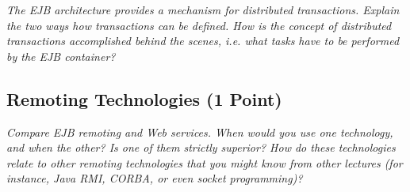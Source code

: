 \documentclass[a4paper,10pt]{article}
\begin{document}
\emph{
The EJB architecture provides a mechanism for distributed transactions. Explain the two ways how
transactions can be defined. How is the concept of distributed transactions accomplished behind the
scenes, i.e. what tasks have to be performed by the EJB container?}

\vspace{3mm}

\subsection{Remoting Technologies (1 Point)}

\emph{Compare EJB remoting and Web services. When would you use one technology, and when the other? Is
one of them strictly superior? How do these technologies relate to other remoting technologies that you
might know from other lectures (for instance, Java RMI, CORBA, or even socket programming)?}

\vspace{3mm}
\end{document}
